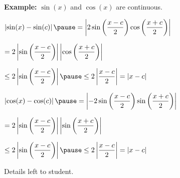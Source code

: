 \documentclass[10pt,aspectratio=149]{beamer}
\begin{document}
\begin{frame}

\textbf{Example:}
$\sin(x)$ and $\cos(x)$ are continuous.

\pause
\medskip

$\displaystyle
\abs{\sin(x)-\sin(c)}
\pause
=
\abs{
2 \sin \left( \frac{x-c}{2} \right) \cos \left( \frac{x+c}{2} \right)
}
$

\pause
\medskip

\qquad$\displaystyle
=
2
\left\lvert { \sin \left( \frac{x-c}{2} \right) } \right\rvert
\left\lvert { \cos \left( \frac{x+c}{2} \right) } \right\rvert
$

\pause
\medskip

\qquad$\displaystyle
\leq
2
\abs{ \sin \left( \frac{x-c}{2} \right) }
\pause
\leq
2
\abs{ \frac{x-c}{2} }
= \abs{x-c}
$

\pause
\medskip

$\displaystyle
\abs{\cos(x)-\cos(c)}
\pause
=
\abs{
-2 \sin \left( \frac{x-c}{2} \right) \sin \left( \frac{x+c}{2} \right)
}
$

\pause
\medskip

\qquad$\displaystyle
=
2
\left\lvert { \sin \left( \frac{x-c}{2} \right) } \right\rvert
\left\lvert { \sin \left( \frac{x+c}{2} \right) } \right\rvert
$

\pause
\medskip

\qquad$\displaystyle
\leq
2
\abs{ \sin \left( \frac{x-c}{2} \right) }
\pause
\leq
2
\abs{ \frac{x-c}{2} }
= \abs{x-c}
$

\pause
\medskip

Details left to student.

\end{frame}
\end{document}
